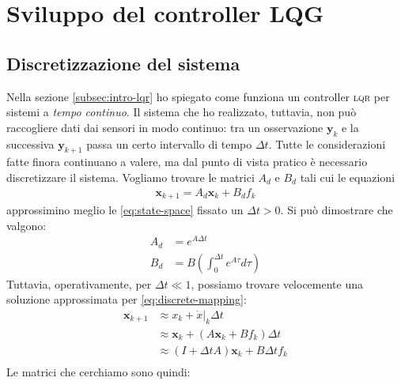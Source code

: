\section{Sviluppo del controller \textsc{LQG}}\label{sec:lqg}
\subsection{Discretizzazione del sistema}\label{subsec:discretizzazione}
Nella sezione \ref{subsec:intro-lqr} ho spiegato come funziona un controller \textsc{lqr} per sistemi a \emph{tempo continuo}.
Il sistema che ho realizzato, tuttavia, non può raccogliere dati dai sensori in modo continuo: tra un osservazione
$\mathbf y_k$ e la successiva $\mathbf y_{k+1}$ passa un certo intervallo di tempo $\Delta t$.
Tutte le considerazioni fatte finora continuano a valere, ma dal punto di vista pratico è necessario discretizzare il sistema.
Vogliamo trovare le matrici $A_d$ e $B_d$ tali cui le equazioni
\begin{equation}
  \begin{aligned}
    \mathbf{x}_{k+1} = A_d \mathbf{x}_k + B_d f_k
  \end{aligned}
  \label{eq:moto-discreto}
\end{equation}
approssimino meglio le \eqref{eq:state-space} fissato un $\Delta t > 0$.
Si può dimostrare\cite{brunton2019data}
che valgono:
\begin{equation}
  \begin{aligned}
    A_d &= e^{A\Delta t} \\
    B_d &= B\left( \int_0^{\Delta t} e^{A \tau} d\tau \right)
  \end{aligned}
  \label{eq:discrete-mapping}
\end{equation}
Tuttavia, operativamente, per $\Delta t \ll 1$, possiamo trovare velocemente una soluzione approssimata per \eqref{eq:discrete-mapping}:
\begin{equation}
  \begin{aligned}
    \mathbf x_{k+1} &\approx x_k + \dot x|_k \Delta t\\
      &\approx \mathbf x_k + (A \mathbf x_k + B f_k) \Delta t\\
      &\approx (I + \Delta t A) \mathbf x_k + B \Delta t f_k\\
  \end{aligned}
  \label{eq:discrete-mapping-approx}
\end{equation}
Le matrici che cerchiamo sono quindi:
